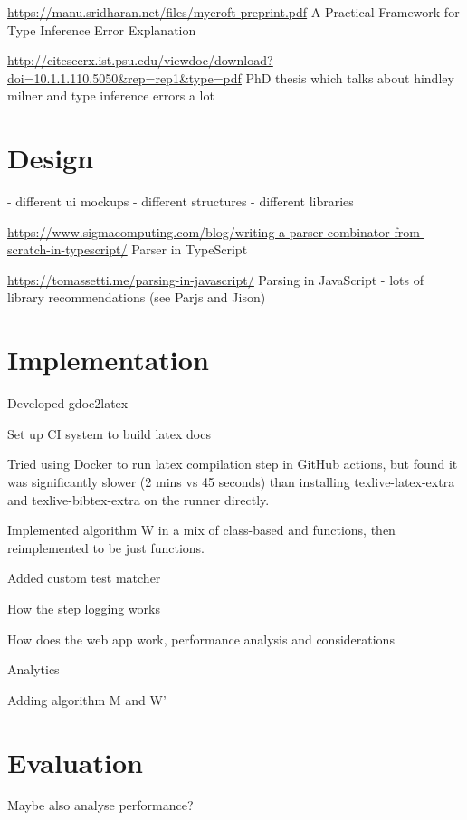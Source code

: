 \documentclass[a4paper,fleqn,12pt]{article}
\begin{document}
\underline{\href{https://manu.sridharan.net/files/mycroft-preprint.pdf}{https://manu.sridharan.net/files/mycroft-preprint.pdf}}
A Practical Framework for Type Inference Error Explanation

\underline{\href{http://citeseerx.ist.psu.edu/viewdoc/download?doi=10.1.1.110.5050\&rep=rep1\&type=pdf}{http://citeseerx.ist.psu.edu/viewdoc/download?doi=10.1.1.110.5050\&rep=rep1\&type=pdf}}
PhD thesis which talks about hindley milner and type inference errors a lot
\section{Design}\label{id:h.7ggvdxb04tzm}
- different ui mockups
- different structures
- different libraries

\underline{\href{https://www.sigmacomputing.com/blog/writing-a-parser-combinator-from-scratch-in-typescript/}{https://www.sigmacomputing.com/blog/writing-a-parser-combinator-from-scratch-in-typescript/}}
Parser in TypeScript

\underline{\href{https://tomassetti.me/parsing-in-javascript/}{https://tomassetti.me/parsing-in-javascript/}}
Parsing in JavaScript - lots of library recommendations (see Parjs and Jison)
\section{Implementation}\label{id:h.igepudpadp49}
Developed gdoc2latex

Set up CI system to build latex docs

Tried using Docker to run latex compilation step in GitHub actions, but found it was significantly slower (2 mins vs 45 seconds) than installing texlive-latex-extra and texlive-bibtex-extra on the runner directly.

Implemented algorithm W in a mix of class-based and functions, then reimplemented to be just functions.

Added custom test matcher

How the step logging works

How does the web app work, performance analysis and considerations

Analytics

Adding algorithm M and W’
\section{Evaluation}\label{id:h.e6letww4nhn0}
Maybe also analyse performance?
\end{document}
